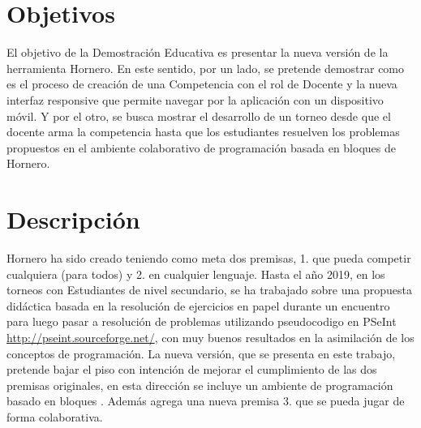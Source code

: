 \documentclass{articleteyet}
\begin{document}
\section{Objetivos}
\label{sec:Obj} 


El objetivo de la Demostración Educativa es presentar la nueva versión de la herramienta Hornero. En este sentido, por un lado, se pretende demostrar  como es el proceso de creación de una Competencia con el rol de Docente y la nueva interfaz responsive que permite navegar por la aplicación con un dispositivo móvil.  Y por el otro, se busca mostrar el desarrollo de un torneo desde que el docente arma la competencia hasta que los estudiantes resuelven los problemas propuestos en el ambiente colaborativo de  programación basada en bloques de Hornero.



\section{Descripción}
Hornero ha sido creado teniendo como meta dos premisas, 1. que pueda competir cualquiera (para todos) y 2. en cualquier lenguaje.  Hasta el año 2019, en los torneos con Estudiantes de nivel secundario,  se ha trabajado sobre una propuesta didáctica basada en la resolución de ejercicios en papel durante un encuentro para luego pasar a resolución de problemas utilizando pseudocodigo en PSeInt \url{http://pseint.sourceforge.net/}, con muy buenos resultados en la asimilación de los conceptos de programación.  La nueva versión, que se presenta en este trabajo, pretende bajar el piso con intención de mejorar el cumplimiento de las dos premisas originales, en esta dirección se incluye un ambiente de programación basado en bloques \cite{Resnick2009ProgrammingForAll} \cite{weintrop2019block}. Además agrega una nueva premisa 3. que se pueda jugar de forma colaborativa. 
\end{document}
